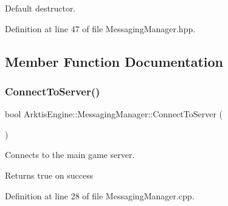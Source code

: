 Default destructor. 

\begin{DoxyVerb}\end{DoxyVerb}
 

Definition at line 47 of file Messaging\+Manager.\+hpp.


\begin{DoxyCode}{0}

\end{DoxyCode}


\subsection{Member Function Documentation}
\mbox{\label{class_arktis_engine_1_1_messaging_manager_af87589a8b61b490eed53fbe9a4d5d637}} 
\subsubsection{\texorpdfstring{ConnectToServer()}{ConnectToServer()}}
{\footnotesize\ttfamily bool Arktis\+Engine\+::\+Messaging\+Manager\+::\+Connect\+To\+Server (\begin{DoxyParamCaption}{ }\end{DoxyParamCaption})}



Connects to the main game server. 

\begin{DoxyReturn}{Returns}
true on success \begin{DoxyVerb}\end{DoxyVerb}
 
\end{DoxyReturn}


Definition at line 28 of file Messaging\+Manager.\+cpp.



